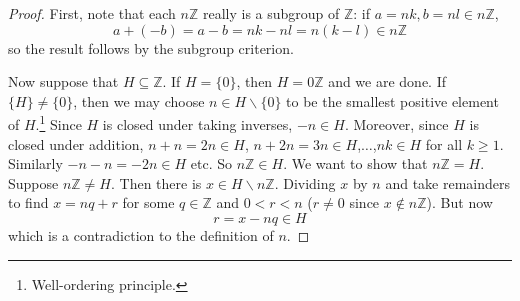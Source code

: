 \documentclass[10pt, a4paper, twoside]{report}
\begin{document}
\begin{proof}
    First, note that each \(n\mathbb{Z}\) really is a subgroup of \(\mathbb{Z}\): if \(a=nk, b=nl\in n\mathbb{Z}\),
    \[a+(-b)=a-b=nk-nl=n(k-l)\in n\mathbb{Z}\]
    so the result follows by the subgroup criterion.

    Now suppose that \(H\subseteq\mathbb{Z}\). If \(H=\{0\}\), then \(H=0\mathbb{Z}\) and we are done. If \(\{H\}\neq\{0\}\), then we may choose \(n\in H\backslash\{0\}\) to be the smallest positive element of \(H\).\footnote{Well-ordering principle.} Since \(H\) is closed under taking inverses, \(-n\in H\). Moreover, since \(H\) is closed under addition, \(n+n=2n\in H\), \(n+2n=3n\in H\),\(\ldots\),\(nk\in H\) for all \(k\geq 1\). Similarly \(-n-n=-2n\in H\) etc. So \(n\mathbb{Z}\in H\). We want to show that \(n\mathbb{Z}=H\). Suppose \(n\mathbb{Z}\neq H\). Then there is \(x\in H\backslash n\mathbb{Z}\). Dividing \(x\) by \(n\) and take remainders to find \(x=nq+r\) for some \(q\in\mathbb{Z}\) and \(0<r<n\) (\(r\neq 0\) since \(x\notin n\mathbb{Z}\)). But now 
    \[r=x-nq\in H\]
    which is a contradiction to the definition of \(n\).
\end{proof}
\end{document}
